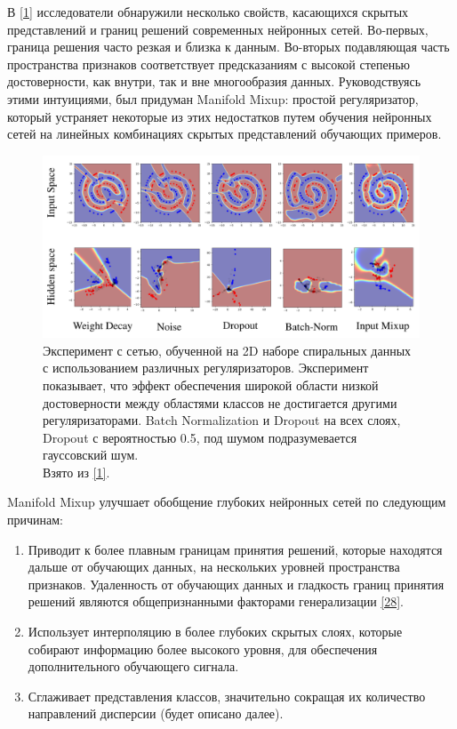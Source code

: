В \hyperlink{cite.Ver18}{[1]} исследователи обнаружили несколько свойств, касающихся скрытых представлений и границ решений современных нейронных сетей. Во-первых, граница решения часто резкая и близка к данным. Во-вторых подавляющая часть пространства признаков соответствует предсказаниям с высокой степенью достоверности, как внутри, так и вне многообразия данных. Руководствуясь этими интуициями, был придуман Manifold Mixup: простой регуляризатор, который устраняет некоторые из этих недостатков путем обучения нейронных сетей на линейных комбинациях скрытых представлений обучающих примеров.

\begin{figure}
    \centering
    \includegraphics[scale=0.25]{./images/mixup.png}
    \caption{\protect\hypertarget{image10}{Эксперимент с сетью, обученной на 2D наборе спиральных данных с использованием различных регуляризаторов. Эксперимент показывает, что эффект обеспечения широкой области низкой достоверности между областями классов не достигается другими регуляризаторами. Batch Normalization и Dropout на всех слоях, Dropout с вероятностью 0.5, под шумом подразумевается гауссовский шум.
 \\ Взято из \protect\hyperlink{cite.Ver18}{[1]}.}}
\end{figure}

Manifold Mixup улучшает обобщение глубоких нейронных сетей по следующим причинам:
\begin{enumerate}
\item Приводит к более плавным границам принятия решений, которые находятся дальше от обучающих данных, на нескольких уровней пространства признаков. Удаленность от обучающих данных и гладкость границ принятия решений являются общепризнанными факторами генерализации \hyperlink{cite.Pet98}{[28]}.  
\item Использует интерполяцию в более глубоких скрытых слоях, которые собирают информацию более высокого уровня, для обеспечения дополнительного обучающего сигнала.
\item Сглаживает представления классов, значительно сокращая их количество направлений дисперсии (будет описано далее).
\end{enumerate}

